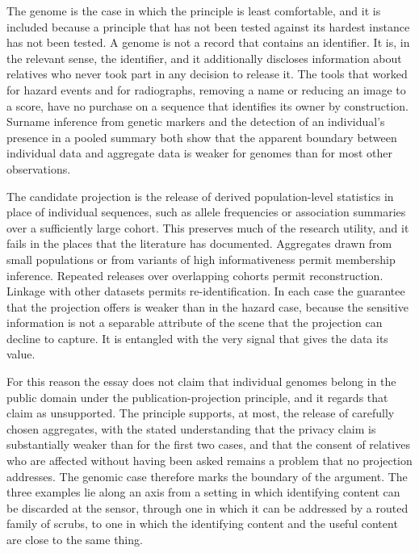 \documentclass[11pt]{article}
\theoremstyle{definition}
\begin{document}
The genome is the case in which the principle is least comfortable, and it is included because a principle that has not been tested against its hardest instance has not been tested. A genome is not a record that contains an identifier. It is, in the relevant sense, the identifier, and it additionally discloses information about relatives who never took part in any decision to release it. The tools that worked for hazard events and for radiographs, removing a name or reducing an image to a score, have no purchase on a sequence that identifies its owner by construction. Surname inference from genetic markers \cite{gymrek2013} and the detection of an individual's presence in a pooled summary \cite{homer2008} both show that the apparent boundary between individual data and aggregate data is weaker for genomes than for most other observations.

The candidate projection is the release of derived population-level statistics in place of individual sequences, such as allele frequencies or association summaries over a sufficiently large cohort. This preserves much of the research utility, and it fails in the places that the literature has documented. Aggregates drawn from small populations or from variants of high informativeness permit membership inference. Repeated releases over overlapping cohorts permit reconstruction. Linkage with other datasets permits re-identification. In each case the guarantee that the projection offers is weaker than in the hazard case, because the sensitive information is not a separable attribute of the scene that the projection can decline to capture. It is entangled with the very signal that gives the data its value.

For this reason the essay does not claim that individual genomes belong in the public domain under the publication-projection principle, and it regards that claim as unsupported. The principle supports, at most, the release of carefully chosen aggregates, with the stated understanding that the privacy claim is substantially weaker than for the first two cases, and that the consent of relatives who are affected without having been asked remains a problem that no projection addresses. The genomic case therefore marks the boundary of the argument. The three examples lie along an axis from a setting in which identifying content can be discarded at the sensor, through one in which it can be addressed by a routed family of scrubs, to one in which the identifying content and the useful content are close to the same thing.
\end{document}
